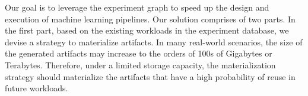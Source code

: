 
Our goal is to leverage the experiment graph to speed up the design and execution of machine learning pipelines.
Our solution comprises of two parts.
In the first part, based on the existing workloads in the experiment database, we devise a strategy to materialize artifacts.
In many real-world scenarios, the size of the generated artifacts may increase to the orders of 100s of Gigabytes or Terabytes.
Therefore, under a limited storage capacity, the materialization strategy should materialize the artifacts that have a high probability of reuse in future workloads.

